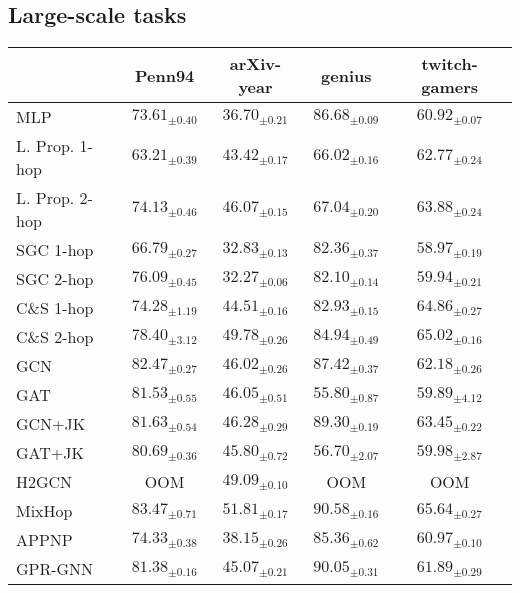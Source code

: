 \documentclass[final,5p,times,twocolumn]{elsarticle}
\begin{document}
\subsection{Large-scale tasks}
\label{sec:experiments-large}



\begin{table*}
	\centering
	\begin{tabular}{lcccc}
		\toprule
		 & \textbf{Penn94} & \textbf{arXiv-year} & \textbf{genius} & \textbf{twitch-gamers} \\
		\midrule
		MLP & $73.61_{\pm 0.40}$ & $36.70_{\pm 0.21}$ & $86.68_{\pm 0.09}$ & $60.92_{\pm 0.07}$ \\
		\midrule
		L. Prop. 1-hop & $63.21_{\pm 0.39}$ & $43.42_{\pm 0.17}$ & $66.02_{\pm 0.16}$ & $62.77_{\pm 0.24}$ \\
		L. Prop. 2-hop & $74.13_{\pm 0.46}$ & $46.07_{\pm 0.15}$ & $67.04_{\pm 0.20}$ & $63.88_{\pm 0.24}$ \\
		SGC 1-hop & $66.79_{\pm 0.27}$ & $32.83_{\pm 0.13}$ & $82.36_{\pm 0.37}$ & $58.97_{\pm 0.19}$ \\
		SGC 2-hop & $76.09_{\pm 0.45}$ & $32.27_{\pm 0.06}$ & $82.10_{\pm 0.14}$ & $59.94_{\pm 0.21}$ \\
		C\&S 1-hop & $74.28_{\pm 1.19}$ & $44.51_{\pm 0.16}$ & $82.93_{\pm 0.15}$ & $64.86_{\pm 0.27}$ \\
		C\&S 2-hop & $78.40_{\pm 3.12}$ & $49.78_{\pm 0.26}$ & $84.94_{\pm 0.49}$ & $65.02_{\pm 0.16}$ \\
		\midrule
		GCN & $82.47_{\pm 0.27}$ & $46.02_{\pm 0.26}$ & $87.42_{\pm 0.37}$ & $62.18_{\pm 0.26}$ \\
		GAT & $81.53_{\pm 0.55}$ & $46.05_{\pm 0.51}$ & $55.80_{\pm 0.87}$ & $59.89_{\pm 4.12}$ \\
		GCN+JK & $81.63_{\pm 0.54}$ & $46.28_{\pm 0.29}$ & $89.30_{\pm 0.19}$ & $63.45_{\pm 0.22}$ \\
		GAT+JK & $80.69_{\pm 0.36}$ & $45.80_{\pm 0.72}$ & $56.70_{\pm 2.07}$ & $59.98_{\pm 2.87}$ \\
		\midrule
		H2GCN & OOM & $49.09_{\pm 0.10}$ & OOM & OOM \\
		MixHop & $83.47_{\pm 0.71}$ & $51.81_{\pm 0.17}$ & $90.58_{\pm 0.16}$ & $65.64_{\pm 0.27}$ \\
		APPNP & $74.33_{\pm 0.38}$ & $38.15_{\pm 0.26}$ & $85.36_{\pm 0.62}$ & $60.97_{\pm 0.10}$ \\
		GPR-GNN & $81.38_{\pm 0.16}$ & $45.07_{\pm 0.21}$ & $90.05_{\pm 0.31}$ & $61.89_{\pm 0.29}$ \\

\end{tabular}
\end{table*}
\end{document}
